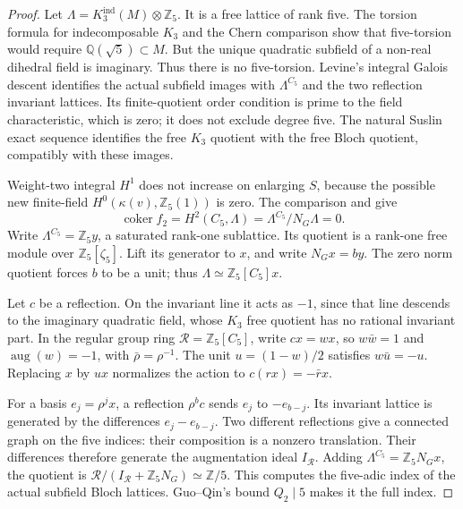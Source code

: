 \documentclass[11pt]{article}
\theoremstyle{remark}\newtheorem{remark}[theorem]{Remark}
\newcommand{\Q}{\mathbb Q}\newcommand{\Z}{\mathbb Z}
\newcommand{\coker}{\operatorname{coker}}
\begin{document}
\begin{proof}
Let \(\Lambda=K_3^{\mathrm{ind}}(M)\otimes\Z_5\).
It is a free lattice of rank five. The torsion formula for indecomposable
\(K_3\) and the Chern comparison \cite[Theorem 4.5 and Corollary 4.6]{Levine}
show that five-torsion would require \(\Q(\sqrt5)\subset M\).
But the unique quadratic subfield of a non-real dihedral field is imaginary.
Thus there is no five-torsion.
Levine's integral Galois descent \cite[Theorem 4.13]{Levine} identifies the
actual subfield images with \(\Lambda^{C_5}\) and the two reflection invariant
lattices. Its finite-quotient order condition is prime to the field
characteristic, which is zero; it does not exclude degree five.
The natural Suslin exact sequence identifies the free \(K_3\) quotient with
the free Bloch quotient, compatibly with these images.

Weight-two integral \(H^1\) does not increase on enlarging \(S\), because
the possible new finite-field \(H^0(\kappa(v),\Z_5(1))\) is zero.
The comparison and \cite[Theorem 1.5]{AM12} give
\[
 \coker f_2=H^2(C_5,\Lambda)
 =\Lambda^{C_5}/N_G\Lambda=0.
\]
Write \(\Lambda^{C_5}=\Z_5y\), a saturated rank-one sublattice. Its quotient
is a rank-one free module over \(\Z_5[\zeta_5]\). Lift its generator to \(x\),
and write \(N_Gx=by\). The zero norm quotient forces \(b\) to be a unit;
thus \(\Lambda\simeq\Z_5[C_5]x\).

Let \(c\) be a reflection. On the invariant line it acts as \(-1\), since
that line descends to the imaginary quadratic field, whose \(K_3\) free
quotient has no rational invariant part. In the regular group ring
\(\mathcal R=\Z_5[C_5]\), write \(cx=wx\), so \(w\bar w=1\) and
\(\operatorname{aug}(w)=-1\), with \(\bar\rho=\rho^{-1}\).
The unit \(u=(1-w)/2\) satisfies \(w\bar u=-u\). Replacing \(x\) by \(ux\)
normalizes the action to \(c(rx)=-\bar r x\).

For a basis \(e_j=\rho^jx\), a reflection \(\rho^bc\) sends
\(e_j\) to \(-e_{b-j}\). Its invariant lattice is generated by the
differences \(e_j-e_{b-j}\). Two different reflections give a connected
graph on the five indices: their composition is a nonzero translation.
Their differences therefore generate the augmentation ideal \(I_{\mathcal R}\).
Adding \(\Lambda^{C_5}=\Z_5N_Gx\), the quotient is
\(\mathcal R/(I_{\mathcal R}+\Z_5N_G)\simeq\Z/5\).
This computes the five-adic index of the actual subfield Bloch lattices.
Guo--Qin's bound \(Q_2\mid5\) makes it the full index.
\end{proof}
\end{document}
